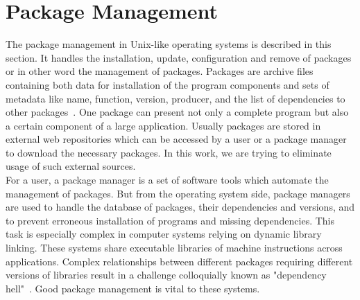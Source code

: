 \section{Package Management} \label{sec:pm}
The package management in Unix-like operating systems is described in this section.
It handles the installation, update, configuration and remove of packages or in other word the management of packages.
Packages are archive files containing both data for installation of the program components and sets of metadata like name, function, version, producer, and the list of dependencies to other packages~\cite*{opium}. 
One package can present not only a complete program but also a certain component of a large application.
Usually packages are stored in external web repositories which can be accessed by a user or a package manager to download the necessary packages. %
In this work, we are trying to eliminate usage of such external sources.\\
For a user, a package manager is a set of software tools which automate the management of packages.
But from the operating system side, package managers are used to handle the database of packages, their dependencies and versions, and to prevent erroneous installation of programs and missing dependencies.
This task is especially complex in computer systems relying on dynamic library linking. 
These systems share executable libraries of machine instructions across  applications. 
Complex relationships between different packages requiring different versions of libraries result in a challenge colloquially known as "dependency hell"~\cite*{linuxgeek}.
Good package management is vital to these systems.\\
